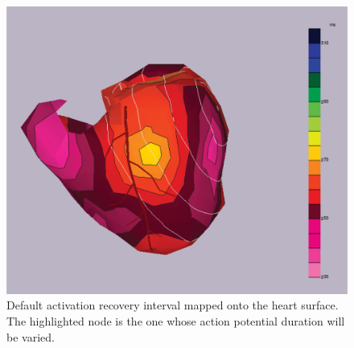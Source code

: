 \documentclass[12pt]{article}
\begin{document}
\begin{figure}[H]
	\centering

	\includegraphics[width=.5\linewidth]{Figures/2_2_baseARI.png}

	\caption{Default activation recovery interval mapped onto the heart surface. The highlighted node is the one whose action potential duration will be varied.}
	\label{2_2_base}
\end{figure}
\end{document}
